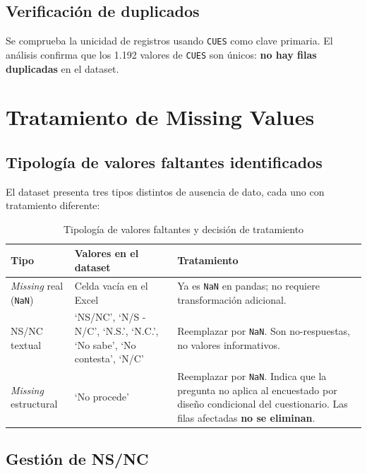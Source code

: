 \documentclass[12pt,a4paper]{article}
\newcommand{\thead}[1]{\cellcolor{tableheader}\color{white}\textbf{#1}}
\begin{document}
\subsection{Verificación de duplicados}

Se comprueba la unicidad de registros usando \texttt{CUES} como clave primaria. El análisis confirma que los 1.192 valores de \texttt{CUES} son únicos: \textbf{no hay filas duplicadas} en el dataset.

\newpage

\section{Tratamiento de Missing Values}

\subsection{Tipología de valores faltantes identificados}

El dataset presenta tres tipos distintos de ausencia de dato, cada uno con tratamiento diferente:

\begin{table}[H]
\centering
\renewcommand{\arraystretch}{1.5}
\begin{tabularx}{\linewidth}{p{3.8cm} p{4cm} X}
\toprule
\thead{Tipo} & \thead{Valores en el dataset} & \thead{Tratamiento} \\
\midrule
\textit{Missing} real (\texttt{NaN}) & Celda vacía en el Excel & Ya es \texttt{NaN} en pandas; no requiere transformación adicional. \\
\rowcolor{tablerow}
NS/NC textual & `NS/NC', `N/S - N/C', `N.S.', `N.C.', `No sabe', `No contesta', `N/C' & Reemplazar por \texttt{NaN}. Son no-respuestas, no valores informativos. \\
\textit{Missing} estructural & `No procede' & Reemplazar por \texttt{NaN}. Indica que la pregunta no aplica al encuestado por diseño condicional del cuestionario. Las filas afectadas \textbf{no se eliminan}. \\
\bottomrule
\end{tabularx}
\caption{Tipología de valores faltantes y decisión de tratamiento}
\end{table}

\subsection{Gestión de NS/NC}
\end{document}
